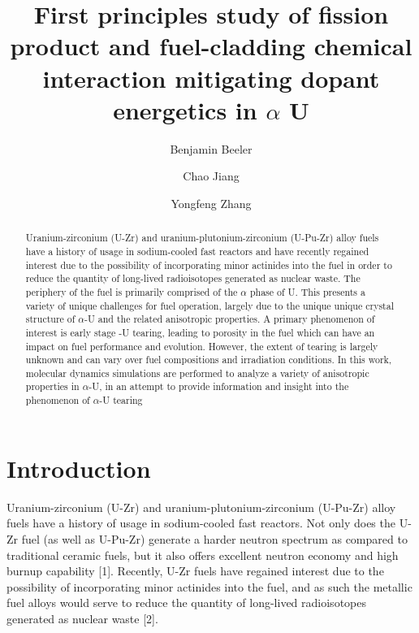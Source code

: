 \documentclass[review]{elsarticle}
\begin{document}
\begin{frontmatter}
\title{First principles study of fission product and fuel-cladding chemical interaction mitigating dopant energetics in $\alpha$ U}

\author[inl]{Benjamin Beeler}
\author[inl]{Chao Jiang}
\author[inl]{Yongfeng Zhang}
\address[inl]{Idaho National Laboratory, Idaho Falls, ID 83415}

\begin{abstract}

Uranium-zirconium (U-Zr) and uranium-plutonium-zirconium (U-Pu-Zr) alloy fuels have a history of usage in sodium-cooled fast reactors and have recently regained interest due to the possibility of incorporating minor actinides into the fuel in order to reduce the quantity of long-lived radioisotopes generated as nuclear waste. The periphery of the fuel is primarily comprised of the $\alpha$ phase of U. This presents a variety of unique challenges for fuel operation, largely due to the unique unique crystal structure of $\alpha$-U and the related anisotropic properties. A primary phenomenon of interest is early stage -U tearing, leading to porosity in the fuel which can have an impact on fuel performance and evolution. However, the extent of tearing is largely unknown and can vary over fuel compositions and irradiation conditions. In this work, molecular dynamics simulations are performed to analyze a variety of anisotropic properties in $\alpha$-U, in an attempt to provide information and insight into the phenomenon of $\alpha$-U tearing

\end{abstract}
\end{frontmatter}

\linenumbers

\section{Introduction}

Uranium-zirconium (U-Zr) and uranium-plutonium-zirconium (U-Pu-Zr) alloy fuels have a history of usage in sodium-cooled fast reactors. Not only does the U-Zr fuel (as well as U-Pu-Zr) generate a harder neutron spectrum as compared to traditional ceramic fuels, but it also offers excellent neutron economy and high burnup capability [1]. Recently, U-Zr fuels have regained interest due to the possibility of incorporating minor actinides into the fuel, and as such the metallic fuel alloys would serve to reduce the quantity of long-lived radioisotopes generated as nuclear waste [2]. 
\end{document}
